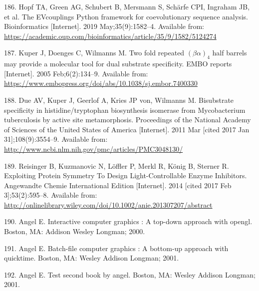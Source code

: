 \documentclass[12pt,twoside]{reedthesis}
\begin{document}
  \hypertarget{ref-hopf_evcouplings_2019}{}
  186. Hopf TA, Green AG, Schubert B, Mersmann S, Schärfe CPI, Ingraham
  JB, et al. The EVcouplings Python framework for coevolutionary sequence
  analysis. Bioinformatics {[}Internet{]}. 2019 May;35(9):1582--4.
  Available from:
  \url{https://academic.oup.com/bioinformatics/article/35/9/1582/5124274}
  
  \hypertarget{ref-kuper_twofold_2005}{}
  187. Kuper J, Doenges C, Wilmanns M. Two fold repeated
  \((\beta\alpha)_4\) half barrels may provide a molecular tool for dual
  substrate specificity. EMBO reports {[}Internet{]}. 2005
  Feb;6(2):134--9. Available from:
  \url{https://www.embopress.org/doi/abs/10.1038/sj.embor.7400330}
  
  \hypertarget{ref-due_bisubstrate_2011}{}
  188. Due AV, Kuper J, Geerlof A, Kries JP von, Wilmanns M. Bisubstrate
  specificity in histidine/tryptophan biosynthesis isomerase from
  Mycobacterium tuberculosis by active site metamorphosis. Proceedings of
  the National Academy of Sciences of the United States of America
  {[}Internet{]}. 2011 Mar {[}cited 2017 Jan 31{]};108(9):3554--9.
  Available from:
  \url{http://www.ncbi.nlm.nih.gov/pmc/articles/PMC3048130/}
  
  \hypertarget{ref-reisinger_exploiting_2014}{}
  189. Reisinger B, Kuzmanovic N, Löffler P, Merkl R, König B, Sterner R.
  Exploiting Protein Symmetry To Design Light-Controllable Enzyme
  Inhibitors. Angewandte Chemie International Edition {[}Internet{]}. 2014
  {[}cited 2017 Feb 3{]};53(2):595--8. Available from:
  \url{http://onlinelibrary.wiley.com/doi/10.1002/anie.201307207/abstract}
  
  \hypertarget{ref-angel2000}{}
  190. Angel E. Interactive computer graphics : A top-down approach with
  opengl. Boston, MA: Addison Wesley Longman; 2000.
  
  \hypertarget{ref-angel2001}{}
  191. Angel E. Batch-file computer graphics : A bottom-up approach with
  quicktime. Boston, MA: Wesley Addison Longman; 2001.
  
  \hypertarget{ref-angel2002a}{}
  192. Angel E. Test second book by angel. Boston, MA: Wesley Addison
  Longman; 2001.


\end{document}
